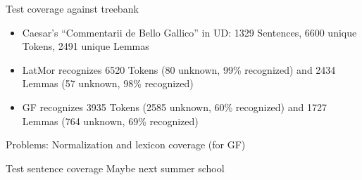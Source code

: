\documentclass{beamer}
\begin{document}
\begin{frame}{Test coverage against treebank}
  \begin{itemize}
  \item Caesar's ``Commentarii de Bello Gallico'' in UD: 1329 Sentences, 6600 unique Tokens, 2491 unique Lemmas
  \item LatMor recognizes 6520 Tokens (80 unknown, 99\% recognized) and 2434 Lemmas (57 unknown, 98\% recognized)
  \item GF recognizes 3935 Tokens (2585 unknown, 60\% recognized) and 1727 Lemmas (764 unknown, 69\% recognized)
  \end{itemize}
  Problems: Normalization and lexicon coverage (for GF)
\end{frame}
\begin{frame}{Test sentence coverage}
  Maybe next summer school
\end{frame}
\end{document}
